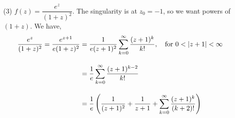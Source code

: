 \begin{example}
\begin{itemize}
\item[(3)] $f(z) = \dfrac{e^z}{(1+z)^2}$. The singularity is at $z_0 = -1$, so we want powers of $(1 + z)$. We have,
\begin{align*}
\frac{e^z}{(1+z)^2} = \frac{e^{z+1}}{e(1+z)^2} &=  \frac{1}{e(z + 1)^2}\sum_{k=0}^\infty \frac{(z+1)^k}{k!},\quad \text{for }0 < \left\lvert z + 1\right\rvert < \infty\\[1em]
 &=\frac{1}{e}\sum_{k=0}^\infty \frac{(z+1)^{k-2}}{k!}\\[1em]
 &=\frac{1}{e}\left(\frac{1}{(z + 1)^2} + \frac{1}{z + 1} + \sum_{k=0}^\infty \frac{(z+1)^k}{(k+2)!}\right)
\end{align*}
\end{itemize}
\end{example}

\vspace*{1em}

